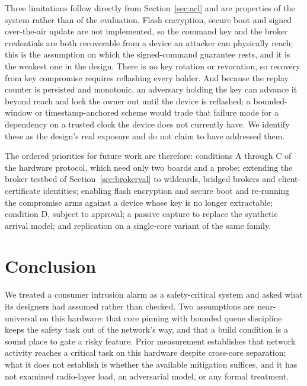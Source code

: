 Three limitations follow directly from Section~\ref{sec:acl} and are properties of the system
rather than of the evaluation. Flash encryption, secure boot and signed over-the-air update are
not implemented, so the command key and the broker credentials are both recoverable from a
device an attacker can physically reach; this is the assumption on which the signed-command
guarantee rests, and it is the weakest one in the design. There is no key rotation or
revocation, so recovery from key compromise requires reflashing every holder. And because the
replay counter is persisted and monotonic, an adversary holding the key can advance it beyond
reach and lock the owner out until the device is reflashed; a bounded-window or
timestamp-anchored scheme would trade that failure mode for a dependency on a trusted clock the
device does not currently have. We identify these as the design's real exposure and do not
claim to have addressed them.

The ordered priorities for future work are therefore: conditions A through C of the hardware
protocol, which need only two boards and a probe; extending the broker testbed of
Section~\ref{sec:brokerval} to wildcards, bridged brokers and client-certificate identities; enabling
flash encryption and secure boot and re-running the compromise arms against a device whose key
is no longer extractable; condition D, subject to approval; a passive capture to replace the
synthetic arrival model; and replication on a single-core variant of the same family.

\section{Conclusion}\label{sec:conclusion}

We treated a consumer intrusion alarm as a safety-critical system and asked what its
designers had assumed rather than checked. Two assumptions are near-universal on this
hardware: that core pinning with bounded queue discipline keeps the safety task out of the
network's way, and that a build condition is a sound place to gate a risky feature. Prior measurement
establishes that network activity reaches a critical task on this hardware despite cross-core
separation; what it does not establish is whether the available mitigation suffices, and it has
not examined radio-layer load, an adversarial model, or any formal treatment.

